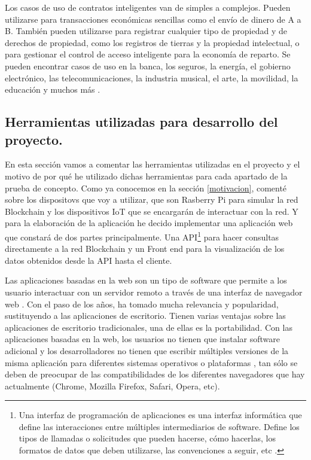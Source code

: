 Los casos de uso de contratos inteligentes van de simples a complejos. Pueden utilizarse para transacciones económicas 
sencillas como el envío de dinero de A a B. También pueden utilizarse para registrar cualquier tipo de propiedad y de 
derechos de propiedad, como los registros de tierras y la propiedad intelectual, o para gestionar el control de acceso 
inteligente para la economía de reparto. Se pueden encontrar casos de uso en la banca, los seguros, la energía, el 
gobierno electrónico, las telecomunicaciones, la industria musical, el arte, la movilidad, la educación y muchos más 
\cite{what-is-smart-contract}.

\subsection{Herramientas utilizadas para desarrollo del proyecto.}

En esta sección vamos a comentar las herramientas utilizadas en el proyecto y el motivo de por qué he utilizado dichas
herramientas para cada apartado de la prueba de concepto. Como ya conocemos en la sección \ref{motivacion}, comenté 
sobre los dispositovs que voy a utilizar, que son Rasberry Pi para simular la red Blockchain y los dispositivos IoT que 
se encargarán de interactuar con la red. Y para la elaboración de la aplicación he decido implementar una aplicación 
web que constará de dos partes principalmente. Una API\footnote{Una interfaz de programación de aplicaciones es una 
interfaz informática que define las interacciones entre múltiples intermediarios de software. Define los tipos de 
llamadas o solicitudes que pueden hacerse, cómo hacerlas, los formatos de datos que deben utilizarse, las convenciones 
a seguir, etc \cite{api}.\label{fnlabel}} para hacer consultas directamente a la red Blockchain y un Front end para la 
visualización de los datos obtenidos desde la API hasta el cliente. 

\vspace{5mm}

\noindent Las aplicaciones basadas en la web son un tipo de software que permite a los usuario interactuar con un 
servidor remoto a través de una interfaz de navegador web \cite{web-based-app}. Con el paso de los años, ha tomado 
mucha relevancia y popularidad, sustituyendo a las aplicaciones de escritorio. Tienen varias ventajas sobre las 
aplicaciones de escritorio tradicionales, una de ellas es la portabilidad. Con las aplicaciones basadas en la web, 
los usuarios no tienen que instalar software adicional y los desarrolladores no tienen que escribir múltiples versiones 
de la misma aplicación para diferentes sistemas operativos o plataformas \cite{web-based-app}, tan sólo se deben de 
preocupar de las compatibilidades de los diferentes navegadores que hay actualmente (Chrome, Mozilla Firefox, Safari, 
Opera, etc).


